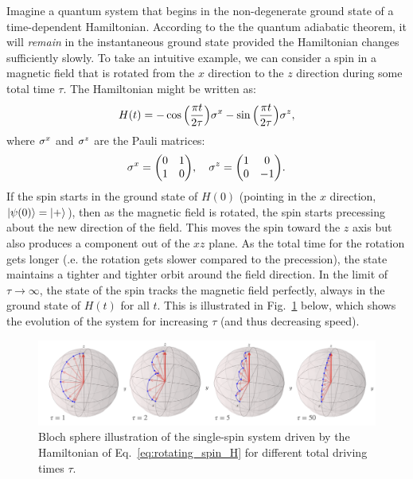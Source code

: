    Imagine a quantum system that begins in the non-degenerate ground state of a time-dependent Hamiltonian. According to the the quantum adiabatic theorem, it will \emph{remain} in the instantaneous ground state provided the Hamiltonian changes sufficiently slowly. To take an intuitive example, we can consider a spin in a magnetic field that is rotated from the $x$ direction to the $z$ direction during some total time $\tau$. The Hamiltonian might be written as:
    \begin{equation}\label{eq:rotating_spin_H}
        H(t) = -\cos\Big(\frac{\pi t}{2 \tau}\Big)\sigma^x - \sin \Big(\frac{\pi t}{2 \tau}\Big)\sigma^z,
    \end{equation}
    where $\sigma^x$ and $\sigma^z$ are the Pauli matrices:
    \begin{equation}
        \sx = \mqty(0 & 1 \\ 1 & 0), \quad \sz = \mqty(1 & 0 \\ 0 & -1).  
    \end{equation}
    If the spin starts in the ground state of $H(0)$ (pointing in the $x$ direction, $\ket{\psi(0)} = \ket{+}$), then as the magnetic field is rotated, the spin starts precessing about the new direction of the field. This moves the spin toward the $z$ axis but also produces a component out of the $xz$ plane. As the total time for the rotation gets longer (\@i.e. the rotation gets slower compared to the precession), the state maintains a tighter and tighter orbit around the field direction. In the limit of $\tau \rightarrow \infty$, the state of the spin tracks the magnetic field perfectly, always in the ground state of $H(t)$ for all $t$. This is illustrated in Fig.~\ref{fig:bloch_rotating_spin} below, which shows the evolution of the system for increasing $\tau$ (and thus decreasing speed).
    
    \begin{figure}[h]
    \centering
    \includegraphics[width=0.9\linewidth]{images/magnetic_field_spin.png} \caption{Bloch sphere illustration of the single-spin system driven by the Hamiltonian of Eq.~\eqref{eq:rotating_spin_H} for different total driving times $\tau$.}\label{fig:bloch_rotating_spin}
    \end{figure}

